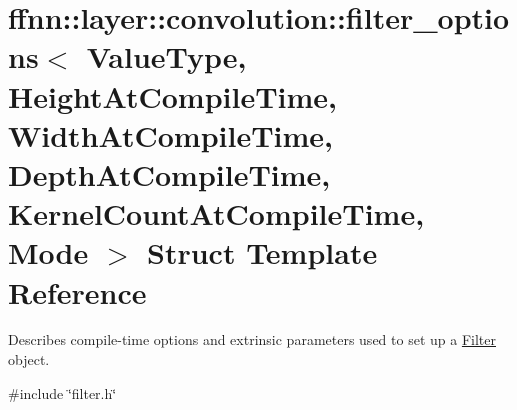\hypertarget{structffnn_1_1layer_1_1convolution_1_1filter__options}{\section{ffnn\-:\-:layer\-:\-:convolution\-:\-:filter\-\_\-options$<$ Value\-Type, Height\-At\-Compile\-Time, Width\-At\-Compile\-Time, Depth\-At\-Compile\-Time, Kernel\-Count\-At\-Compile\-Time, Mode $>$ Struct Template Reference}
\label{structffnn_1_1layer_1_1convolution_1_1filter__options}
}


Describes compile-\/time options and extrinsic parameters used to set up a \hyperlink{structffnn_1_1layer_1_1convolution_1_1_filter}{Filter} object.  




{\ttfamily \#include \char`\"{}filter.\-h\char`\"{}}

